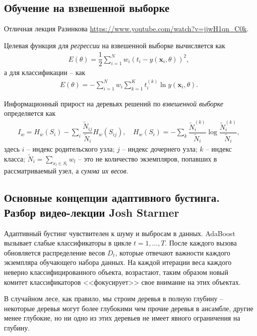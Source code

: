 \documentclass[%
	11pt,
	a4paper,
	utf8,
		]{article}
\begin{document}
\subsection{Обучение на взвешенной выборке}

Отличная лекция Разинкова \url{https://www.youtube.com/watch?v=jjwH1qn_C0k}.

Целевая функция для \emph{регрессии} на взвешенной выборке вычисляется как
\begin{align*}
	E(\theta) = \dfrac{1}{2} \sum_{i=1}^{N} w_i (t_i - y(\mathbf{x}_i, \theta))^2,
\end{align*}
а для классификации -- как
\begin{align*}
	E(\theta) = - \sum_{i=1}^{N}w_i \sum_{k=1}^{K} t_i^{(k)}\ln {y}(\mathbf{x}_i, \theta).
\end{align*}

Информационный прирост на деревьях решений по \emph{взвешенной выборке} определяется как
\begin{align*}
	I_w = H_w(S_i) - \sum_{i} \dfrac{\tilde{N}_{ij}}{\tilde{N}_i} H_w(S_{ij}), \quad H_w(S_i) = - \sum_k \dfrac{\tilde{N}_i^{(k)}}{\tilde{N}_i} \log \dfrac{\tilde{N}_i^{(k)}}{\tilde{N}_i},
\end{align*}
здесь $ i $ -- индекс родительского узла; $ j $ -- индекс дочернего узла; $ k $ -- индекс класса; $ \tilde{N}_i = \sum\limits_{x_l \in S_i} w_l $ -- это не количество экземпляров, попавших в рассматриваемый узел, а \emph{сумма их весов}.



\subsection{Основные концепции адаптивного бустинга. Разбор видео-лекции Josh Starmer}

Адаптивный бустинг чувствителен к шуму и выбросам в данных. AdaBoost вызывает слабые классификаторы в цикле $ t = 1, \ldots, T $. После каждого вызова обновляется распределение весов $ D_t $, которые отвечают важности каждого экземпляра обучающего набора данных. На каждой итерации веса каждого неверно классифицированного объекта, возрастают, таким образом новый комитет классификаторов <<фокусирует>> свое внимание на этих объектах.

В случайном лесе, как правило, мы строим деревья в полную глубину -- некоторые деревья могут более глубокими чем прочие деревья в ансамбле, другие менее глубокие, но ни одно из этих деревьев не имеет явного ограничения на глубину.
\end{document}
